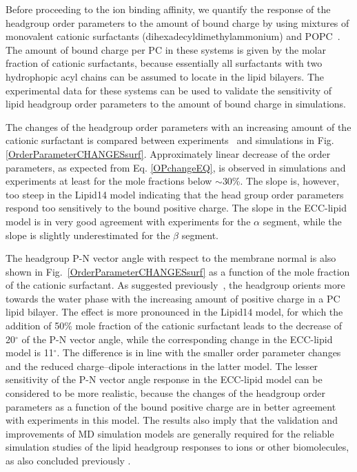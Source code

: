\documentclass[aip,jcp,twocolumn]{revtex4}
\begin{document}
Before proceeding to the ion binding affinity, we quantify
the response of the headgroup order parameters to the amount of 
bound charge by using mixtures of monovalent cationic
surfactants (dihexadecyldimethylammonium)
and POPC~\cite{scherer89}. The amount of bound charge per PC 
in these systems is given by the molar fraction of cationic 
surfactants, because essentially all surfactants with two hydrophopic
acyl chains can be assumed to locate in the lipid bilayers.
The experimental data for these systems can be used to validate 
the sensitivity of lipid headgroup order parameters
to the amount of bound charge in simulations.

The changes of the headgroup order parameters with an increasing amount of 
the cationic surfactant is compared between experiments~\cite{scherer89} and
simulations in Fig. \ref{OrderParameterCHANGESsurf}.
Approximately linear decrease of the order parameters, as expected from Eq. \ref{OPchangeEQ},
is observed in simulations and experiments at least for the mole fractions
below $\sim$30\%. The slope is, however, too steep in the Lipid14 model indicating that 
the head group order parameters respond too sensitively to the bound positive charge.
The slope in the ECC-lipid model is in very good agreement with experiments
for the $\alpha$ segment, while the slope is slightly
underestimated for the $\beta$ segment.

The headgroup P-N vector angle with respect to the membrane normal
is also shown in Fig.~\ref{OrderParameterCHANGESsurf}
as a function of the mole fraction of the cationic surfactant.
As suggested previously~\cite{seelig87}, the headgroup orients
more towards the water phase with the increasing amount of positive
charge in a PC lipid bilayer. The effect is more pronounced in the
Lipid14 model, for which the addition of 50\% mole fraction of the cationic
surfactant leads to the decrease of 20$^{\circ}$ of the P-N vector angle,
while the corresponding change in the ECC-lipid model is 11$^{\circ}$.
The difference is in line with the smaller order parameter 
changes and the reduced charge--dipole interactions in the latter model.
The lesser sensitivity of the P-N vector angle response in the ECC-lipid
model can be considered to be more realistic, because the changes of the headgroup
order parameters as a function of the bound positive charge
are in better agreement with experiments in this model.
The results also imply that the validation and improvements of MD simulation
models are generally required for the reliable simulation studies of the
lipid headgroup responses to ions or other biomolecules, as also concluded
previously \cite{botan15}.
\end{document}
